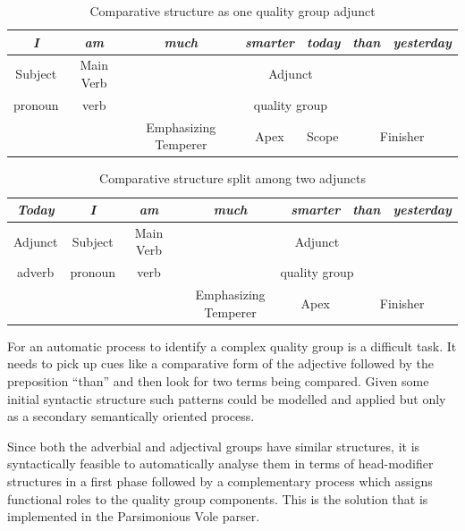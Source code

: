 	\begin{table}[!ht]
		\centering
		\begin{tabular}{|c|c|c|c|l|c|c|}
			\hline
			\textit{I} & \textit{am} & \textit{much} & \textit{smarter} & \textit{today} & \textit{than} & \textit{yesterday} \\ \hline
			Subject & Main Verb & \multicolumn{5}{c|}{Adjunct} \\ \hline
			pronoun & verb & \multicolumn{5}{c|}{quality group} \\ \hline
			&  & Emphasizing Temperer & Apex & Scope & \multicolumn{2}{c|}{Finisher} \\ \hline
		\end{tabular}
		\caption{Comparative structure as one quality group adjunct}
		\label{tab:csgq1}
	\end{table}
	\begin{table}[!ht]
		\centering
		\begin{tabular}{|c|c|c|c|c|c|c|}
			\hline
			\textit{Today} & \textit{I} & \textit{am} & \textit{much} & \textit{smarter} & \textit{than} & \textit{yesterday} \\ \hline
			Adjunct & Subject & Main Verb & \multicolumn{4}{c|}{Adjunct} \\ \hline
			adverb & pronoun & verb & \multicolumn{4}{c|}{quality group} \\ \hline
			&  &  & Emphasizing Temperer & Apex & \multicolumn{2}{c|}{Finisher} \\ \hline
		\end{tabular}
		\caption{Comparative structure split among two adjuncts}
		\label{tab:csgq2}
	\end{table}
    
	For an automatic process to identify a complex quality group is a difficult task. It needs to pick up cues like a comparative form of the adjective followed by the preposition ``than'' and then look for two terms being compared. Given some initial syntactic structure such patterns could be modelled and applied but only as a secondary semantically oriented process.
	
	Since both the adverbial and adjectival groups have similar structures, it is syntactically feasible to automatically analyse them in terms of head-modifier structures in a first phase followed by a complementary process which assigns functional roles to the quality group components. This is the solution that is implemented in the Parsimonious Vole parser. 

